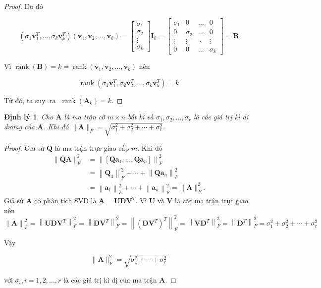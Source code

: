 \documentclass[12pt,a4paper,oneside]{report}
\newtheorem{dl}{Định lý}[section]
\numberwithin{equation}{section}
\begin{document}
\begin{proof}
Do đó

$$
\left(\sigma_{1} \mathbf{v}_{1}^{T}, \ldots, \sigma_{k} \mathbf{v}_{k}^{T}\right)\left(\mathbf{v}_{1}, \mathbf{v}_{2}, \ldots, \mathbf{v}_{k}\right)=\left[\begin{array}{c}
	\sigma_{1} \\
	\sigma_{2} \\
	\vdots \\
	\sigma_{k}
\end{array}\right] \mathbf{I}_{k}=\left[\begin{array}{cccc}
	\sigma_{1} & 0 & \ldots & 0 \\
	0 & \sigma_{2} & \ldots & 0 \\
	\vdots & \vdots & \ddots & \vdots \\
	0 & 0 & \ldots & \sigma_{k}
\end{array}\right]=\mathbf{B}
$$

Vì  $\operatorname{rank}(\mathbf{B})=k=\operatorname{rank}\left(\mathbf{v}_{1}, \mathbf{v}_{2}, \ldots, \mathbf{v}_{k}\right)$ nên

$$
\operatorname{rank}\left(\sigma_{1} \mathbf{v}_{1}^{T}, \sigma_{2} \mathbf{v}_{2}^{T}, \ldots, \sigma_{k} \mathbf{v}_{k}^{T}\right)=k
$$

Từ đó, ta suy $\operatorname{ra~} \operatorname{rank}\left(\mathbf{A}_{k}\right)=k$.
\end{proof}
\begin{dl} 
 Cho $\mathbf{A}$ là ma trận cỡ $m \times n$ bất kì và $\sigma_{1}, \sigma_{2}, \ldots, \sigma_{r}$ là các giá trị kì dị dương của $\mathbf{A}$. Khi đó $\|\mathbf{A}\|_{F}=\sqrt{\sigma_{1}^{2}+\sigma_{2}^{2}+\cdots+\sigma_{r}^{2}}$.
\end{dl} 
\begin{proof}
Giả sử $\mathbf{Q}$ là ma trận trực giao cấp $m$. Khi đó
\begin{align*}
\|\mathbf{Q} \mathbf{A}\|_{F}^{2}&=\left\|\left[\mathbf{Q} \mathbf{a}_{1}, \ldots, \mathbf{Q} \mathbf{a}_{n}\right]\right\|_{F}^{2}\\
&=\left\|\mathbf{Q}_{\mathbf{1}}\right\|_{F}^{2}+\cdots+\left\|\mathbf{Q} \mathbf{a}_{n}\right\|_{F}^{2}\\
&=\left\|\mathbf{a}_{1}\right\|_{F}^{2}+\cdots+\left\|\mathbf{a}_{n}\right\|_{F}^{2}=\|\mathbf{A}\|_{F}^{2}.
\end{align*}
Giả sử $\mathbf{A}$ có phân tích $\mathrm{SVD}$ là $\mathbf{A}=\mathbf{U D V}^{T}$. Vì $\mathbf{U}$ và $\mathbf{V}$ là các ma trận trực giao nên
$$
\left.\|\mathbf{A}\right\|_{F}^{2}=\left\|\mathbf{U D V}^{T}\right\|_{F}^{2}=\left\| \mathbf{D V}^{T}\right\|_{F}^{2}=\left\|\left(\mathbf{D V}^{T}\right)^{T}\right\|_{F}^{2}=\left\| \mathbf{V D}^{T}\right\|_{F}^{2}=\left\| \mathbf{D}^{T}\right \|_{F}^{2}=\sigma_{1}^{2}+\sigma_{2}^{2}+\cdots+\sigma_{r}^{2}
$$

Vậy

$$
\|\mathbf{A}\|_{F}^{2}=\sqrt{\sigma_{1}^{2}+\cdots+\sigma_{r}^{2}}
$$

với $\sigma_{i}, i=1,2, \ldots, r$ là các giá trị kì dị của ma trận $\mathbf{A}$.
\end{proof} 
\end{document}

